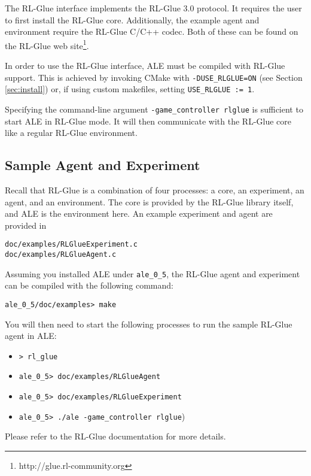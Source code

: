 \documentclass[12pt]{article}
\begin{document}
The RL-Glue interface implements the RL-Glue 3.0 protocol.
It requires the user to first install the RL-Glue core. Additionally, the example agent and 
environment require the RL-Glue C/C++ codec. Both of these can be found on the RL-Glue web
site\footnote{http://glue.rl-community.org}.

In order to use the RL-Glue interface, ALE must be compiled with RL-Glue support. This is achieved
by invoking CMake with \verb+-DUSE_RLGLUE=ON+ (see Section \ref{sec:install}) or, if using
custom makefiles, setting \verb+USE_RLGLUE := 1+. 

Specifying the command-line argument \verb+-game_controller rlglue+ is sufficient to start ALE in 
RL-Glue mode. It will then communicate with the RL-Glue core like a regular RL-Glue environment.

\subsection{Sample Agent and Experiment}

Recall that RL-Glue is a combination of four processes: a core, an experiment, an agent, and
an environment. The core is provided by the RL-Glue library itself, and ALE is the environment
here. An example experiment and agent are provided in 

\begin{verbatim}
doc/examples/RLGlueExperiment.c
doc/examples/RLGlueAgent.c
\end{verbatim}

Assuming you installed ALE under \verb+ale_0_5+, the RL-Glue agent and experiment
can be compiled with the following command: 

\begin{verbatim}
ale_0_5/doc/examples> make 
\end{verbatim}

You will then need to start the following processes to run the sample RL-Glue agent in ALE:

\begin{itemize}
  \item{\verb+> rl_glue+} 
  \item{\verb+ale_0_5> doc/examples/RLGlueAgent+}
  \item{\verb+ale_0_5> doc/examples/RLGlueExperiment+}
  \item{\verb+ale_0_5> ./ale -game_controller rlglue+)}
\end{itemize}

Please refer to the RL-Glue documentation for more details. 
\end{document}
